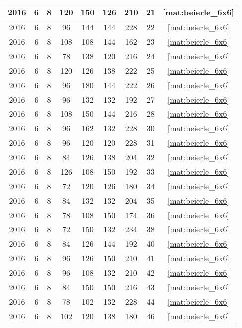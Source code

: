 \begin{longtable}{|c|c|c|c|c|c|c|c|c|}
2016 & 6 & 8 & 120 & 150 & 126 & 210 & 21 & \eqref{mat:beierle_6x6} \\ \hline 
2016 & 6 & 8 & 96 & 144 & 144 & 228 & 22 & \eqref{mat:beierle_6x6} \\ \hline 
2016 & 6 & 8 & 108 & 108 & 144 & 162 & 23 & \eqref{mat:beierle_6x6} \\ \hline 
2016 & 6 & 8 & 78 & 138 & 120 & 216 & 24 & \eqref{mat:beierle_6x6} \\ \hline 
2016 & 6 & 8 & 120 & 126 & 138 & 222 & 25 & \eqref{mat:beierle_6x6} \\ \hline 
2016 & 6 & 8 & 96 & 180 & 144 & 222 & 26 & \eqref{mat:beierle_6x6} \\ \hline 
2016 & 6 & 8 & 96 & 132 & 132 & 192 & 27 & \eqref{mat:beierle_6x6} \\ \hline 
2016 & 6 & 8 & 108 & 150 & 144 & 216 & 28 & \eqref{mat:beierle_6x6} \\ \hline 
2016 & 6 & 8 & 96 & 162 & 132 & 228 & 30 & \eqref{mat:beierle_6x6} \\ \hline 
2016 & 6 & 8 & 96 & 120 & 120 & 228 & 31 & \eqref{mat:beierle_6x6} \\ \hline 
2016 & 6 & 8 & 84 & 126 & 138 & 204 & 32 & \eqref{mat:beierle_6x6} \\ \hline 
2016 & 6 & 8 & 126 & 108 & 150 & 192 & 33 & \eqref{mat:beierle_6x6} \\ \hline 
2016 & 6 & 8 & 72 & 120 & 126 & 180 & 34 & \eqref{mat:beierle_6x6} \\ \hline 
2016 & 6 & 8 & 84 & 132 & 132 & 204 & 35 & \eqref{mat:beierle_6x6} \\ \hline 
2016 & 6 & 8 & 78 & 108 & 150 & 174 & 36 & \eqref{mat:beierle_6x6} \\ \hline 
2016 & 6 & 8 & 72 & 150 & 132 & 234 & 38 & \eqref{mat:beierle_6x6} \\ \hline 
2016 & 6 & 8 & 84 & 126 & 144 & 192 & 40 & \eqref{mat:beierle_6x6} \\ \hline 
2016 & 6 & 8 & 96 & 126 & 150 & 210 & 41 & \eqref{mat:beierle_6x6} \\ \hline 
2016 & 6 & 8 & 96 & 108 & 132 & 210 & 42 & \eqref{mat:beierle_6x6} \\ \hline 
2016 & 6 & 8 & 84 & 150 & 150 & 216 & 43 & \eqref{mat:beierle_6x6} \\ \hline 
2016 & 6 & 8 & 78 & 102 & 132 & 228 & 44 & \eqref{mat:beierle_6x6} \\ \hline 
2016 & 6 & 8 & 102 & 120 & 138 & 180 & 46 & \eqref{mat:beierle_6x6} \\ \hline 

\end{longtable}
